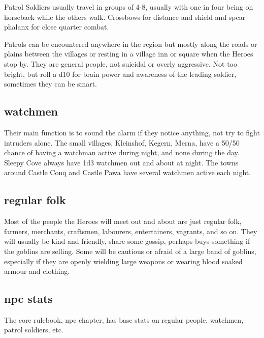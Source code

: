 Patrol Soldiers usually travel in groups of 4-8, usually with one in four being on horseback while the others walk. Crossbows for distance and shield and spear phalanx for close quarter combat.

Patrols can be encountered anywhere in the region but mostly along the roads or plains between the villages or resting in a village inn or square when the Heroes stop by. They are general people, not suicidal or overly aggressive. Not too bright, but roll a d10 for brain power and awareness of the leading soldier, sometimes they can be smart.


\subsection*{watchmen}

Their main function is to sound the alarm if they notice anything, not try to fight intruders alone. 
The small villages, Kleinshof, Kegern, Merna, have a 50/50 chance of having a watchman active during night, and none during the day. Sleepy Cove always have 1d3 watchmen out and about at night. 
The towns around Castle Conq and Castle Pawa have several watchmen active each night.


\subsection*{regular folk}

Most of the people the Heroes will meet out and about are just regular folk, farmers, merchants, craftsmen, labourers, entertainers, vagrants, and so on. They will usually be kind and friendly, share some gossip, perhaps buys something if the goblins are selling. Some will be cautious or afraid of a large band of goblins, especially if they are openly wielding large weapons or wearing blood soaked armour and clothing.


\subsection*{npc stats}

The core rulebook, npc chapter, has base stats on regular people, watchmen, patrol soldiers, etc.


























